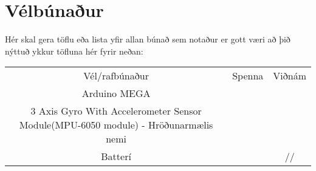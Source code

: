 \section{Vélbúnaður}
Hér skal gera töflu eða lista yfir allan búnað sem notaður er gott væri að þið nýttuð ykkur töfluna hér fyrir neðan:

\begin{center}
\begin{tabular}{ |c|c|c| } 
 \hline
 Vél/rafbúnaður &Spenna &Viðnám\\ 
 Arduino MEGA & &\\ 
 3 Axis Gyro With Accelerometer Sensor Module(MPU-6050 module) - Hröðunarmælis nemi & &\\
Batterí & &//
 \hline
\end{tabular}
\end{center}
